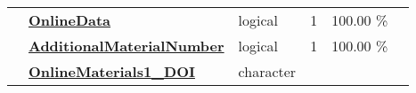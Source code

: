 \documentclass[]{article}
\begin{document}
\begin{longtable}[]{@{}lllrcl@{}}
\begin{minipage}[t]{0.07\columnwidth}\raggedright\strut
\strut
\end{minipage} & \begin{minipage}[t]{0.35\columnwidth}\raggedright\strut
\textbf{\protect\hyperlink{onlinedata}{OnlineData}}\strut
\end{minipage} & \begin{minipage}[t]{0.11\columnwidth}\raggedright\strut
logical\strut
\end{minipage} & \begin{minipage}[t]{0.10\columnwidth}\raggedleft\strut
1\strut
\end{minipage} & \begin{minipage}[t]{0.10\columnwidth}\centering\strut
100.00 \%\strut
\end{minipage} & \begin{minipage}[t]{0.12\columnwidth}\raggedright\strut
\strut
\end{minipage}\tabularnewline
\begin{minipage}[t]{0.07\columnwidth}\raggedright\strut
\strut
\end{minipage} & \begin{minipage}[t]{0.35\columnwidth}\raggedright\strut
\textbf{\protect\hyperlink{additionalmaterialnumber}{AdditionalMaterialNumber}}\strut
\end{minipage} & \begin{minipage}[t]{0.11\columnwidth}\raggedright\strut
logical\strut
\end{minipage} & \begin{minipage}[t]{0.10\columnwidth}\raggedleft\strut
1\strut
\end{minipage} & \begin{minipage}[t]{0.10\columnwidth}\centering\strut
100.00 \%\strut
\end{minipage} & \begin{minipage}[t]{0.12\columnwidth}\raggedright\strut
\strut
\end{minipage}\tabularnewline
\begin{minipage}[t]{0.07\columnwidth}\raggedright\strut
\strut
\end{minipage} & \begin{minipage}[t]{0.35\columnwidth}\raggedright\strut
\textbf{\protect\hyperlink{onlinematerials1_doi}{OnlineMaterials1\_DOI}}\strut
\end{minipage} & \begin{minipage}[t]{0.11\columnwidth}\raggedright\strut
character\strut

\end{minipage}
\end{longtable}
\end{document}
